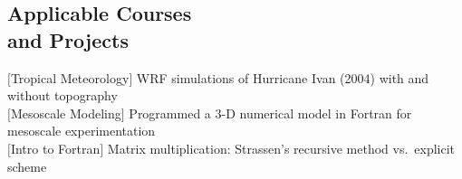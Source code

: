 \documentclass[margin,line]{resume}
\begin{document}
\begin{resume}
\section{\mysidestyle Applicable Courses\\and Projects}

$[$Tropical Meteorology$]$ WRF simulations of Hurricane Ivan (2004) with and without topography\vspace{0.5mm}\\
$[$Mesoscale Modeling$]$ Programmed a 3-D numerical model in Fortran for mesoscale experimentation\vspace{0.5mm}\\
$[$Intro to Fortran$]$ Matrix multiplication: Strassen's recursive method vs.\ explicit scheme\vspace{0.5mm}\\






\end{resume}
\end{document}
